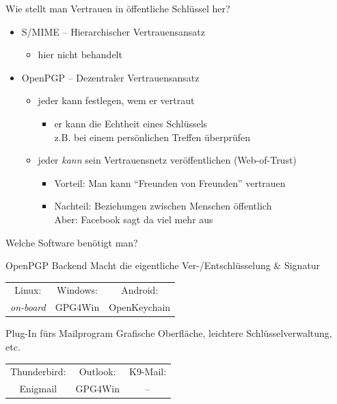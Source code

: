 \begin{frame}{Wie stellt man Vertrauen in öffentliche Schlüssel her?}
  \begin{itemize}
    \item S/MIME -- Hierarchischer Vertrauensansatz
    \begin{itemize}
      \item hier nicht behandelt
    \end{itemize}
    \item OpenPGP -- Dezentraler Vertrauensansatz
    \begin{itemize}
      \item jeder kann festlegen, wem er vertraut
      \begin{itemize}
        \item er kann die Echtheit eines Schlüssels\\ z.B. bei einem persönlichen Treffen überprüfen
      \end{itemize}
      \item jeder \emph{kann} sein Vertrauensnetz veröffentlichen (Web-of-Trust)
      \begin{itemize}
        \item Vorteil: Man kann ``Freunden von Freunden'' vertrauen
        \item Nachteil: Beziehungen zwischen Menschen öffentlich\\ Aber: Facebook sagt da viel mehr aus
      \end{itemize}
    \end{itemize}
  \end{itemize}
\end{frame}

\begin{frame}{Welche Software benötigt man?}
  \begin{block}{OpenPGP Backend}
    Macht die eigentliche Ver-/Entschlüsselung \& Signatur

    \vspace{1ex}
    \begin{tabular}{ccc}
      Linux:            & Windows: & Android:     \\
      \textit{on-board} & GPG4Win  & OpenKeychain \\
    \end{tabular}
  \end{block}
  \begin{block}{Plug-In fürs Mailprogram}
    Grafische Oberfläche, leichtere Schlüsselverwaltung, etc.

    \vspace{1ex}
    \begin{tabular}{ccc}
      Thunderbird: & Outlook: & K9-Mail: \\
      Enigmail     & GPG4Win  & --       \\
    \end{tabular}
  \end{block}
\end{frame}

\endinput

